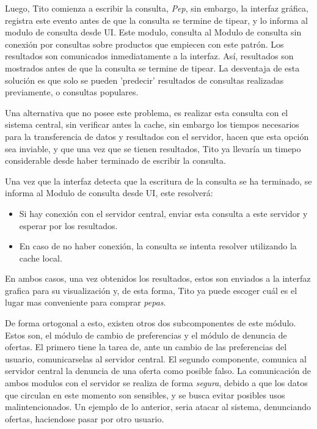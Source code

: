 Luego, Tito comienza a escribir la consulta, \emph{Pep}, sin embargo, la interfaz gráfica, registra este evento antes de que la consulta se termine de tipear, y lo informa al \textsf{modulo de consulta desde UI}. Este modulo, consulta al \textsf{Modulo de consulta sin conexión} por consultas sobre productos que empiecen con este patrón. Los resultados son comunicados inmediatamente a la interfaz. Así, resultados son mostrados antes de que la consulta se termine de tipear. La desventaja de esta solución es que solo se pueden 'predecir' resultados de consultas realizadas previamente, o consultas populares. 

Una alternativa que no posee este problema, es realizar esta consulta con el sistema central, sin verificar antes la cache, sin embargo los tiempos necesarios para la transferencia de datos y resultados con el servidor, hacen que esta opción sea inviable, y que una vez que se tienen resultados, Tito ya llevaría un timepo considerable desde haber terminado de escribir la consulta.

Una vez que la interfaz detecta que la escritura de la consulta se ha terminado, se informa al \textsf{Modulo de consulta desde UI}, este resolverá:
\begin{itemize}
	\item Si hay conexión con el servidor central, enviar esta consulta a este servidor y esperar por los resultados. 
	\item En caso de no haber conexión, la consulta se intenta resolver utilizando la cache local.
\end{itemize}

En ambos casos, una vez obtenidos los resultados, estos son enviados a la interfaz grafica para su visualización y, de esta forma, Tito ya puede escoger cuál es el lugar mas conveniente para comprar \emph{pepas}.

De forma ortogonal a esto, existen otros dos subcomponentes de este módulo. Estos son, el \textsf{módulo de cambio de preferencias} y el \textsf{módulo de denuncia de ofertas}. El primero tiene la tarea de, ante un cambio de las preferencias del usuario, comunicarselas al servidor central. El segundo componente, comunica al servidor central la denuncia de una oferta como posible falso. La comunicación de ambos modulos con el servidor se realiza de forma \emph{segura}, debido a que los datos que circulan en este momento son sensibles, y se busca evitar posibles usos malintencionados. Un ejemplo de lo anterior, seria atacar al sistema, denunciando ofertas, haciendose pasar por otro usuario. 

